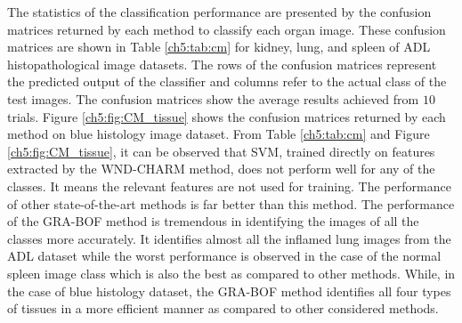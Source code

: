 The statistics of the classification performance are presented by the confusion matrices returned by each method to classify each organ image. These confusion matrices are shown in Table \ref{ch5:tab:cm}  for kidney, lung, and spleen of ADL histopathological image datasets. The rows of the confusion matrices represent the predicted output of the classifier and columns refer to the actual class of the test images.  The confusion matrices show the average results achieved from $10$ trials. Figure \ref{ch5:fig:CM_tissue} shows the confusion matrices returned by each method on blue histology image dataset.  From Table \ref{ch5:tab:cm} and Figure \ref{ch5:fig:CM_tissue},  it can be observed that SVM, trained directly on features extracted by the WND-CHARM method, does not perform well for any of the classes. It means the relevant features are not used for training. The performance of other state-of-the-art methods is far better than this method.  The performance of the GRA-BOF method is tremendous in identifying the images of all the classes more accurately. It identifies almost all the inflamed lung images from the ADL dataset while the worst performance is observed in the case of the normal spleen image class which is also the best as compared to other methods. While, in the case of blue histology dataset, the GRA-BOF method identifies all four types of tissues in a more efficient manner as compared to other considered methods. 

